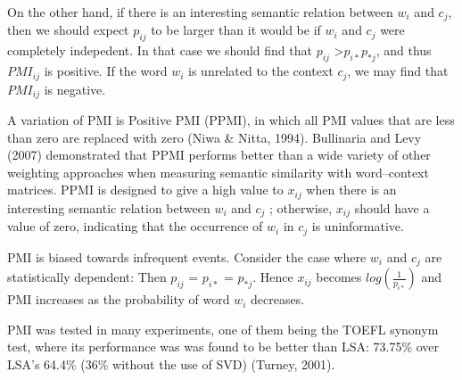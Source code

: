 On the other hand, if there is an interesting semantic relation between $w_{i}$ and $c_{j}$, then we should expect $p_{ij}$ to be larger than it would be if $w_{i}$ and $c_{j}$ were completely indepedent. In that case we should find that $p_{ij}$ >$p_{i*}$$p_{*j}$, and thus   $PMI_{ij}$ is positive. If the word $w_{i}$ is unrelated to the context $c_{j}$, we may find that   $PMI_{ij}$ is negative. 

A variation of PMI is Positive PMI (PPMI), in which all PMI values that are less than zero are replaced with zero (Niwa \& Nitta, 1994). Bullinaria and Levy (2007) demonstrated that PPMI performs better than a wide variety of other weighting approaches when measuring semantic similarity with word--context matrices. PPMI is designed to give a high value to $x_{ij}$ when there is an interesting semantic relation between $w_{i}$ and $c_{j}$ ; otherwise, $x_{ij}$ should have a value of zero, indicating that the occurrence of $w_{i}$ in $c_{j}$ is uninformative.

PMI is biased towards infrequent events. Consider the case where $w_{i}$ and $c_{j}$ are statistically 
dependent: Then $p_{ij}$  = $p_{i*}$ = $p_{*j}$. Hence $x_{ij}$ becomes $log (\frac{1}{p_{i*}})$ 
and PMI increases as the probability of word $w_i$ decreases. 

PMI was tested in many experiments, one of them being the TOEFL synonym test, where its performance  was was found to be better than LSA: 73.75\% over LSA's 64.4\% (36\% without the use of SVD) (Turney, 2001).

